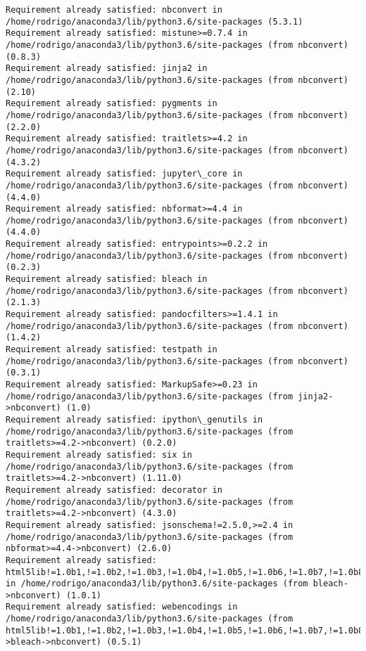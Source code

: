 \documentclass[11pt]{article}
\begin{document}
    \begin{Verbatim}[commandchars=\\\{\}]
Requirement already satisfied: nbconvert in /home/rodrigo/anaconda3/lib/python3.6/site-packages (5.3.1)
Requirement already satisfied: mistune>=0.7.4 in /home/rodrigo/anaconda3/lib/python3.6/site-packages (from nbconvert) (0.8.3)
Requirement already satisfied: jinja2 in /home/rodrigo/anaconda3/lib/python3.6/site-packages (from nbconvert) (2.10)
Requirement already satisfied: pygments in /home/rodrigo/anaconda3/lib/python3.6/site-packages (from nbconvert) (2.2.0)
Requirement already satisfied: traitlets>=4.2 in /home/rodrigo/anaconda3/lib/python3.6/site-packages (from nbconvert) (4.3.2)
Requirement already satisfied: jupyter\_core in /home/rodrigo/anaconda3/lib/python3.6/site-packages (from nbconvert) (4.4.0)
Requirement already satisfied: nbformat>=4.4 in /home/rodrigo/anaconda3/lib/python3.6/site-packages (from nbconvert) (4.4.0)
Requirement already satisfied: entrypoints>=0.2.2 in /home/rodrigo/anaconda3/lib/python3.6/site-packages (from nbconvert) (0.2.3)
Requirement already satisfied: bleach in /home/rodrigo/anaconda3/lib/python3.6/site-packages (from nbconvert) (2.1.3)
Requirement already satisfied: pandocfilters>=1.4.1 in /home/rodrigo/anaconda3/lib/python3.6/site-packages (from nbconvert) (1.4.2)
Requirement already satisfied: testpath in /home/rodrigo/anaconda3/lib/python3.6/site-packages (from nbconvert) (0.3.1)
Requirement already satisfied: MarkupSafe>=0.23 in /home/rodrigo/anaconda3/lib/python3.6/site-packages (from jinja2->nbconvert) (1.0)
Requirement already satisfied: ipython\_genutils in /home/rodrigo/anaconda3/lib/python3.6/site-packages (from traitlets>=4.2->nbconvert) (0.2.0)
Requirement already satisfied: six in /home/rodrigo/anaconda3/lib/python3.6/site-packages (from traitlets>=4.2->nbconvert) (1.11.0)
Requirement already satisfied: decorator in /home/rodrigo/anaconda3/lib/python3.6/site-packages (from traitlets>=4.2->nbconvert) (4.3.0)
Requirement already satisfied: jsonschema!=2.5.0,>=2.4 in /home/rodrigo/anaconda3/lib/python3.6/site-packages (from nbformat>=4.4->nbconvert) (2.6.0)
Requirement already satisfied: html5lib!=1.0b1,!=1.0b2,!=1.0b3,!=1.0b4,!=1.0b5,!=1.0b6,!=1.0b7,!=1.0b8,>=0.99999999pre in /home/rodrigo/anaconda3/lib/python3.6/site-packages (from bleach->nbconvert) (1.0.1)
Requirement already satisfied: webencodings in /home/rodrigo/anaconda3/lib/python3.6/site-packages (from html5lib!=1.0b1,!=1.0b2,!=1.0b3,!=1.0b4,!=1.0b5,!=1.0b6,!=1.0b7,!=1.0b8,>=0.99999999pre->bleach->nbconvert) (0.5.1)

    \end{Verbatim}
\end{document}
